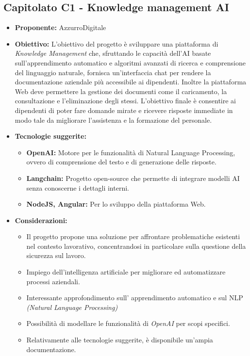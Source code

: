 \documentclass{article}
\begin{document}
\subsection{\textbf{Capitolato C1} - Knowledge management AI}
\begin{itemize}
    \item[] \textbf{Proponente:} AzzurroDigitale
    
    \item[] \textbf{Obiettivo:} L'obiettivo del progetto è sviluppare una piattaforma di \textit{Knowledge Management} che, sfruttando le capacità dell’AI basate sull’apprendimento automatico e algoritmi avanzati di ricerca e comprensione del linguaggio naturale, fornisca un'interfaccia chat per rendere la documentazione aziendale più accessibile ai dipendenti.
    Inoltre la piattaforma Web deve permettere la gestione dei documenti come il caricamento, la consultazione e l'eliminazione degli stessi.
    L'obiettivo finale è consentire ai dipendenti di poter fare domande mirate e ricevere risposte immediate in modo tale da migliorare l'assistenza e la formazione del personale.

    \item[] \textbf{Tecnologie suggerite:}
    \begin{itemize}
        \item \textbf{OpenAI:} Motore per le funzionalità di Natural Language Processing, ovvero di comprensione del testo e di generazione delle risposte.
        \item \textbf{Langchain:} Progetto open-source che permette di integrare modelli AI senza conoscerne i dettagli interni.
        \item \textbf{NodeJS, Angular:} Per lo sviluppo della piattaforma Web.  
    \end{itemize}
    
    \item[] \textbf{Considerazioni:}
    \begin{itemize}
        \item Il progetto propone una soluzione per affrontare problematiche esistenti nel contesto lavorativo, concentrandosi in particolare sulla questione della sicurezza sul lavoro.
        \item Impiego dell’intelligenza artificiale per migliorare ed automatizzare processi aziendali.
        \item Interessante approfondimento sull’ apprendimento automatico e sul NLP \textit{(Natural Language Processing)}
        \item Possibilità di modellare le funzionalità di \textit{OpenAI} per scopi specifici.
        \item Relativamente alle tecnologie suggerite, è disponibile un'ampia documentazione.
    \end{itemize}
    
\end{itemize}
\pagebreak
\end{document}
